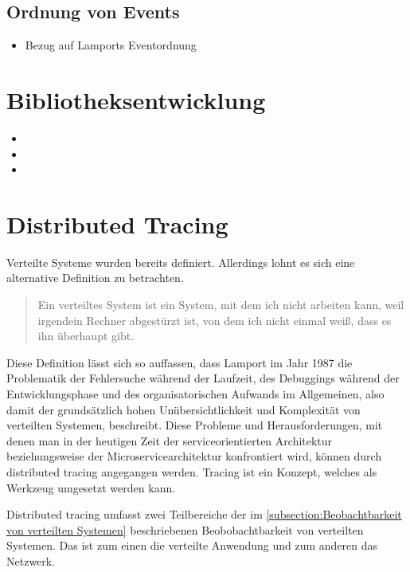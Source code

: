 \subsection{Ordnung von Events}
\label{subsection:Ordnung von Events}
\begin{itemize}
	\item Bezug auf Lamports Eventordnung
\end{itemize}
\section{Bibliotheksentwicklung}
\label{subsection:Bibliotheksentwicklung}
\begin{itemize}
	\item 
	\item 
	\item
\end{itemize}

\section{Distributed Tracing}
\label{subsection:Erkenntnisinteresse}
Verteilte Systeme wurden bereits definiert. Allerdings lohnt es sich eine alternative Definition zu betrachten.

\begin{quote}
	Ein verteiltes System ist ein System, mit dem ich nicht arbeiten kann, weil irgendein Rechner abgestürzt ist, von dem ich nicht einmal weiß, dass es ihn überhaupt gibt.
\end{quote}


Diese Definition lässt sich so auffassen, dass Lamport im Jahr 1987 die Problematik der Fehlersuche während der Laufzeit, des Debuggings während der Entwicklungsphase und des organisatorischen Aufwands im Allgemeinen, also damit der grundsätzlich hohen Unübersichtlichkeit und Komplexität von verteilten Systemen, beschreibt. Diese Probleme und Herausforderungen, mit denen man in der heutigen Zeit der serviceorientierten Architektur beziehungsweise der Microservicearchitektur konfrontiert wird, können durch distributed tracing angegangen werden. Tracing ist ein Konzept, welches als Werkzeug umgesetzt werden kann. 


Distributed tracing umfasst zwei Teilbereiche der im \cref{subsection:Beobachtbarkeit von verteilten Systemen} beschriebenen Beobobachtbarkeit von verteilten Systemen. Das ist zum einen die verteilte Anwendung und zum anderen das Netzwerk. 


